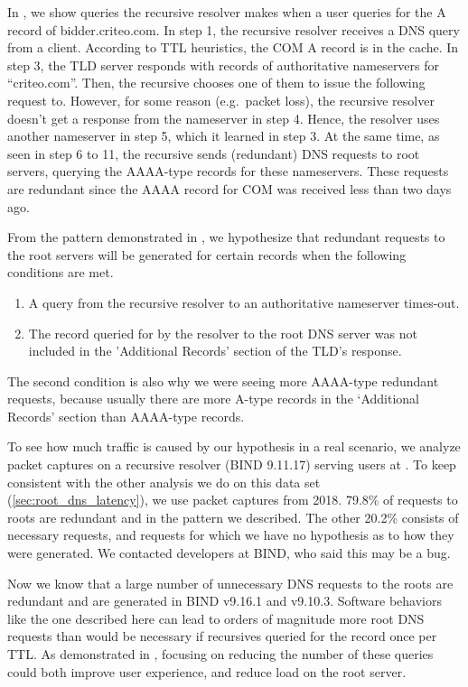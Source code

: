 \documentclass[sigconf,letterpaper,nonacm,10pt,anonymous]{acmart}
\begin{document}
In , we show queries the recursive resolver
makes when a user queries for the A record of bidder.criteo.com. In step
1, the recursive resolver receives a DNS query from a client. According
to TTL heuristics, the COM A record is in the cache. In step 3, the TLD
server responds with records of authoritative nameservers for
``criteo.com''. Then, the recursive chooses one of them to issue the
following request to. However, for some reason (e.g.~packet loss), the
recursive resolver doesn't get a response from the nameserver in step 4.
Hence, the resolver uses another nameserver in step 5, which it learned
in step 3. At the same time, as seen in step 6 to 11, the recursive
sends (redundant) DNS requests to root servers, querying the AAAA-type
records for these nameservers. These requests are redundant since the
AAAA record for COM was received less than two days ago.

From the pattern demonstrated in , we
hypothesize that redundant requests to the root servers will be
generated for certain records when the following conditions are met.

\begin{enumerate}
        \item{A query from the recursive resolver to an authoritative nameserver times-out.}
        \item{The record queried for by the resolver to the root DNS server was not included in the 'Additional Records' section of the TLD's response.}
\end{enumerate}

The second condition is also why we were seeing more AAAA-type redundant
requests, because usually there are more A-type records in the
`Additional Records' section than AAAA-type records.

To see how much traffic is caused by our hypothesis in a real scenario,
we analyze packet captures on a recursive resolver (BIND 9.11.17)
serving users at \ISIone. To keep consistent with the other analysis we
do on this data set (\cref{sec:root_dns_latency}), we use packet
captures from 2018. 79.8\% of requests to roots are redundant and in the
pattern we described. The other 20.2\% consists of necessary requests,
and requests for which we have no hypothesis as to how they were
generated. We contacted developers at BIND, who said this may be a bug.

Now we know that a large number of unnecessary DNS requests to the roots
are redundant and are generated in BIND v9.16.1 and v9.10.3. Software
behaviors like the one described here can lead to orders of magnitude
more root DNS requests than would be necessary if recursives queried for
the record once per TTL. As demonstrated in
, focusing on reducing the number of
these queries could both improve user experience, and reduce load on the
root server.
\end{document}
